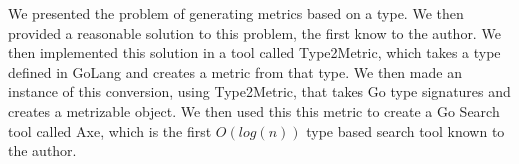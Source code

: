 We presented the problem of generating metrics based on a type.
We then provided a reasonable solution to this problem,
the first know to the author.
We then implemented this solution in a tool called Type2Metric,
which takes a type defined in GoLang and creates a metric from that type.
We then made an instance of this conversion,
using Type2Metric,
that takes Go type signatures and creates a metrizable object.
We then used this this metric to create a Go Search tool called Axe,
which is the first $O(log(n))$ type based search tool known to the author.
